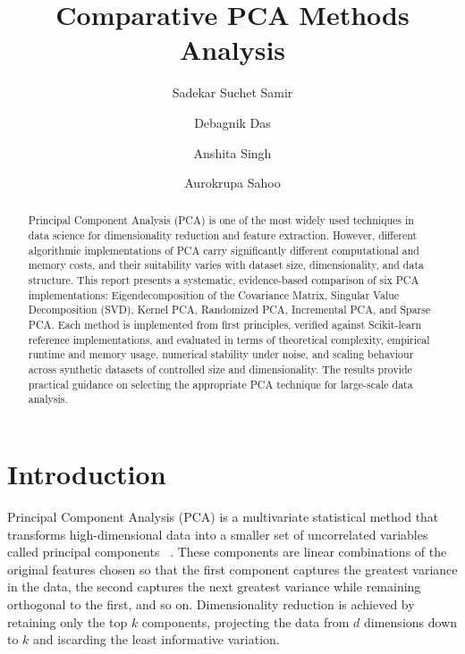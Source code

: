 

\title{Comparative PCA Methods Analysis}

\author{
    \small Sadekar Suchet Samir \and
    \small Debagnik Das \and
    \small Anshita Singh \and
    \small Aurokrupa Sahoo
    }



\maketitle

\begin{abstract}
Principal Component Analysis (PCA) is one of the most widely used techniques
in data science for dimensionality reduction and feature extraction. However,
different algorithmic implementations of PCA carry significantly different
computational and memory costs, and their suitability varies with dataset size,
dimensionality, and data structure. This report presents a systematic,
evidence-based comparison of six PCA implementations: Eigendecomposition of
the Covariance Matrix, Singular Value Decomposition (SVD), Kernel PCA,
Randomized PCA, Incremental PCA, and Sparse PCA. Each method is implemented
from first principles, verified against Scikit-learn reference implementations,
and evaluated in terms of theoretical complexity, empirical runtime and memory
usage, numerical stability under noise, and scaling behaviour across synthetic
datasets of controlled size and dimensionality. The results provide practical
guidance on selecting the appropriate PCA technique for large-scale data
analysis.
\end{abstract}

\section{Introduction}

Principal Component Analysis (PCA) is a multivariate statistical method that transforms high-dimensional data into a smaller set of uncorrelated variables called principal  components ~\citep{greenacre_pca_2022}. These components are linear combinations of the original features chosen so that the first component captures the greatest variance in the data, the second captures the next greatest variance while remaining orthogonal to the first, and so on. Dimensionality reduction is achieved by retaining only the top $k$ components, projecting the data from $d$ dimensions down to $k$ and iscarding the least informative variation.
\smallskip

